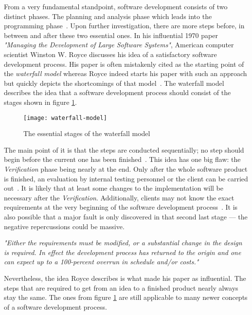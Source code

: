 \documentclass[12pt,a4paper]{report}
\begin{document}
From a very fundamental standpoint, software development consists of two distinct phases.
The planning and analysis phase which leads into the programming phase~\cite{royce-large-systems}.
Upon further investigation, there are more steps before, in between and after these two essential ones.
In his influential 1970 paper \textit{"Managing the Development of Large Software Systems"},
American computer scientist Winston W. Royce discusses his idea of a satisfactory
software development process. His paper is often mistakenly cited as the starting point
of the \textit{waterfall model} whereas Royce indeed starts his paper with such an approach but quickly
depicts the shortcomings of that model~\cite{royce-large-systems, larman-iid-history}.
The waterfall model describes the idea that a software development process should consist of
the stages shown in figure \ref{fig:waterfall-model}.
\begin{figure}[htbp]
\centering
\texttt{[image: waterfall-model]}
\caption{The essential stages of the waterfall model}
\label{fig:waterfall-model}
\end{figure}
The main point of it is that the steps are conducted sequentially;
no step should begin before the current one has been finished~\cite{boehm-spiral}.
This idea has one big flaw: the \textit{Verification} phase being nearly at the end.
Only after the whole software product is finished, an evaluation by
internal testing personnel or the client can be carried out~\cite{royce-large-systems}.
It is likely that at least some changes to the implementation will be necessary after the \textit{Verification}.
Additionally, clients may not know the exact requirements at the very beginning
of the software development process~\cite{parnas-rational-design-process}.
It is also possible that a major fault is only discovered in that second last stage ---
the negative repercussions could be massive.
\begin{displayquote}
\emph{"Either the requirements must be modified, or a substantial change
in the design is required. In effect the development process has returned to
the origin and one can expect up to a 100-percent overrun
in schedule and/or costs."}~\cite{royce-large-systems}
\end{displayquote}
Nevertheless, the idea Royce describes is what made his paper as influential.
The steps that are required to get from an idea to a finished product nearly always
stay the same. The ones from figure \ref{fig:waterfall-model} are still applicable to
many newer concepts of a software development process.
\end{document}
